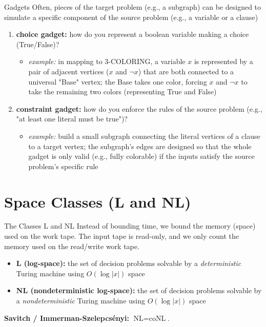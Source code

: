 \documentclass[a4paper, 11pt]{report}
\begin{document}
\begin{defframe}{Gadgets}{}
Often, pieces of the target problem (e.g., a subgraph) can be designed to simulate a specific component of the source problem (e.g., a variable or a clause)
\begin{enumerate}
    \item \textbf{choice gadget:} how do you represent a boolean variable making a choice (True/False)?
    \begin{itemize}
        \item \textit{example:} in mapping to $\text{3-COLORING}$, a variable $x$ is represented by a pair of adjacent vertices ($x$ and $\neg x$) that are both connected to a universal "Base" vertex; the Base takes one color, forcing $x$ and $\neg x$ to take the remaining two colors (representing True and False)
    \end{itemize}
    \item \textbf{constraint gadget:} how do you enforce the rules of the source problem (e.g., "at least one literal must be true")?
    \begin{itemize}
        \item \textit{example:} build a small subgraph connecting the literal vertices of a clause to a target vertex; the subgraph's edges are designed so that the whole gadget is only valid (e.g., fully colorable) if the inputs satisfy the source problem's specific rule
    \end{itemize}
\end{enumerate}
\end{defframe}

\section{Space Classes (L and NL)}

\begin{defframe}{The Classes L and NL}{}
Instead of bounding time, we bound the memory (space) used on the work tape. The input tape is read-only, and we only count the memory used on the read/write work tape.

\begin{itemize}
    \item \textbf{L (log-space):} the set of decision problems solvable by a \textit{deterministic} Turing machine using $O(\log|x|)$ space
    \item \textbf{NL (nondeterministic log-space):} the set of decision problems solvable by a \textit{nondeterministic} Turing machine using $O(\log|x|)$ space
\end{itemize}
\textbf{Savitch / Immerman-Szelepcsényi:} $\text{NL} = \text{coNL}$.
\end{defframe}
\end{document}
